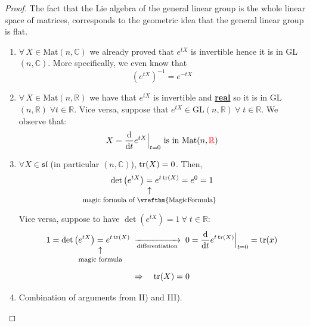\documentclass[../main.tex]{subfiles}
\begin{document}
\begin{proof}
The fact that the Lie algebra of the general linear group is the whole linear space of matrices, corresponds to the geometric idea that the general linear group is flat.
\renewcommand{\labelenumi}{\Roman{enumi})}
\begin{enumerate}
    \item $\forall\, X\in\text{Mat}(n,\mathbb{C})$ we already proved that $e^{tX}$ is invertible hence it is in GL$(n,\mathbb{C})$. More specifically, we even know that \[\left(e^{tX}\right)^{-1}=e^{-tX}\]
    \item $\forall\, X\in\text{Mat}(n,\mathbb{R})$ we have that $e^{tX}$ is invertible and \underline{\textbf{real}} so it is in GL$(n,\mathbb{R})\;\forall t\in\mathbb{R}$. Vice versa, suppose that $e^{tX}\in\textrm{GL}(n,\mathbb{R}) \ \forall\; t\in\mathbb{R}$. We observe that:
    \[
    X=\dv{t}e^{tX}\Bigr|_{\substack{t=0}} \ \text{is in Mat}(n,{\color{red}\mathbb{R}})
    \]
    \item $\forall X\in\mathfrak{sl}$ (in particular $(n,\mathbb{C})$), {\color{red}$\tr(X)=0$}. Then, 
    \[
    \det\left(e^{tX}\right)\underset{\mathclap{\tikz \node {$\uparrow$} node [below=1ex] {\footnotesize  magic formula of \vrefthm{MagicFormula}};}}{=}e^{t\tr(X)}=e^0=1
    \]
    Vice versa, suppose to have $\det\left(e^{tX}\right)=1\ \forall\; t\in\mathbb{R}$:
    \[
    1=\det\left(e^{tX}\right)\underset{\mathclap{\tikz \node {$\uparrow$} node [below=1ex] {\footnotesize  magic formula};}}=e^{t\tr(X)}\;\xrightarrow[\text{differentiation}]{}\;0=\dv{t}e^{t\tr(X)}\Bigr|_{\substack{t=0}}=\tr(x)
    \]
    \[
    \Rightarrow\quad \tr(X)=0
    \]
    \item Combination of arguments from II) and III).
\end{enumerate}
\end{proof}
\end{document}
